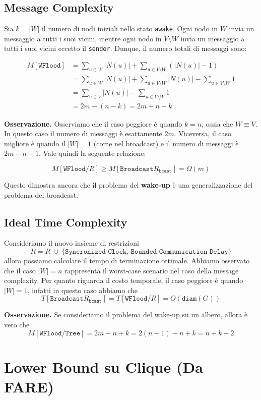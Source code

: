 \subsection{Message Complexity}

Sia $k = |W|$ il numero di nodi iniziali nello stato \texttt{awake}. Ogni nodo in $W$ invia un messaggio a tutti i suoi vicini, mentre ogni nodo in $V \setminus W$ invia un messaggio a tutti i suoi vicini eccetto il \texttt{sender}. Dunque, il numero totali di messaggi sono:

\begin{align*}
    M[\texttt{WFlood}] 
    &= \sum_{u \in W} |N(u)| + \sum_{u \in V \setminus W} (|N(u)| - 1) \\ 
    &= \sum_{u \in W} |N(u)| + \sum_{u \in V \setminus W} |N(u)| - \sum_{u \in V \setminus W}1 \\
    &= \sum_{u \in V} |N(u)| - \sum_{u \in V \setminus W} 1 \\
    &= 2m - (n - k) = 2m + n - k 
\end{align*}

\textbf{Osservazione.} Osserviamo che il caso peggiore è quando $k = n$, ossia che $W \equiv V$. In questo caso il numero di messaggi è esattamente $2m$. Viceversa, il caso migliore è quando il $|W| = 1$ (come nel broadcast) e il numero di messaggi è $2m - n + 1$. Vale quindi la seguente relazione:

\[
    M[\texttt{WFlood}/R] \geq 
    M[\texttt{Broadcast}R_{\texttt{bcast}}] = \Omega(m)
\]

Questo dimostra ancora che il problema del \textbf{wake-up} è una generalizzazione del problema del broadcast.

\subsection{Ideal Time Complexity}

Consideriamo il nuovo insieme di restrizioni
\[
    R = R\ \cup\ \{\texttt{Syncronized Clock, Bounded Communication Delay}\}
\]
allora possiamo calcolare il tempo di terminazione ottimale. Abbiamo osservato che il caso $|W| = n$ rappresenta il worst-case scenario nel caso della message complexity. Per quanto riguarda il costo temporale, il caso peggiore è quando $|W| = 1$, infatti in questo caso abbiamo che
\[
    T[\texttt{Broadcast}R_{\texttt{bcast}}] = T[\texttt{WFlood}/R] = O(\texttt{diam}(G))
\]

\textbf{Osservazione.} Se consideriamo il problema del wake-up su un albero, allora è vero che
\[
M[\texttt{WFlood/Tree}] = 2m - n + k = 2(n - 1) - n + k = n + k - 2
\]

\section{Lower Bound su Clique (Da FARE)}